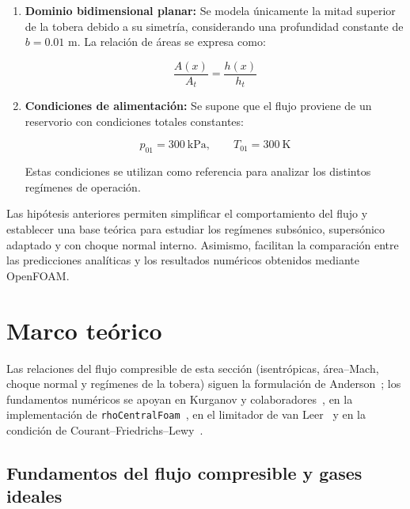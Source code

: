 \documentclass[12pt,letterpaper]{article}
\numberwithin{equation}{section}
\begin{document}
\begin{enumerate}
    \begin{equation}
        p_{02} < p_{01}
    \end{equation}

    \item \textbf{Dominio bidimensional planar:}
    Se modela únicamente la mitad superior de la
    tobera debido a su simetría, considerando una
    profundidad constante de $b = 0.01$ m.
    La relación de áreas se expresa como:

    \begin{equation}
        \frac{A(x)}{A_t} = \frac{h(x)}{h_t}
    \end{equation}

    \item \textbf{Condiciones de alimentación:}
    Se supone que el flujo proviene de un reservorio
    con condiciones totales constantes:

    \begin{equation}
        p_{01} = 300\ \mathrm{kPa},
        \qquad T_{01} = 300\ \mathrm{K}
    \end{equation}

    Estas condiciones se utilizan como referencia
    para analizar los distintos regímenes de operación.

\end{enumerate}

Las hipótesis anteriores permiten simplificar el
comportamiento del flujo y establecer una base teórica
para estudiar los regímenes subsónico, supersónico
adaptado y con choque normal interno. Asimismo,
facilitan la comparación entre las predicciones
analíticas y los resultados numéricos obtenidos
mediante OpenFOAM.

\newpage
\section{Marco teórico}
\label{sec:marco}

Las relaciones del flujo compresible de esta sección (isentrópicas, área--Mach, choque normal y regímenes de la tobera) siguen la formulación de Anderson~\cite{anderson2003,anderson2017}; los fundamentos numéricos se apoyan en Kurganov y colaboradores~\cite{kurganov2000,kurganov2001}, en la implementación de \texttt{rhoCentralFoam}~\cite{greenshields2010}, en el limitador de van Leer~\cite{vanleer1979} y en la condición de Courant--Friedrichs--Lewy~\cite{cfl1928}.

\subsection{Fundamentos del flujo compresible y gases ideales}
\end{document}
